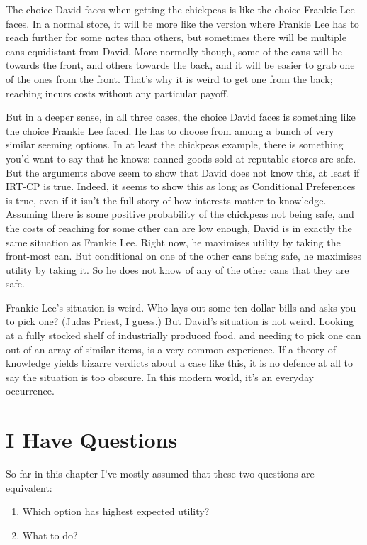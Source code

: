 \documentclass[
  12pt,
  letterpaper,
]{scrbook}
\providecommand{\tightlist}{%
  \setlength{\itemsep}{0pt}\setlength{\parskip}{0pt}}\usepackage{longtable,booktabs,array}
\begin{document}
The choice David faces when getting the chickpeas is like the choice
Frankie Lee faces. In a normal store, it will be more like the version
where Frankie Lee has to reach further for some notes than others, but
sometimes there will be multiple cans equidistant from David. More
normally though, some of the cans will be towards the front, and others
towards the back, and it will be easier to grab one of the ones from the
front. That's why it is weird to get one from the back; reaching incurs
costs without any particular payoff.

But in a deeper sense, in all three cases, the choice David faces is
something like the choice Frankie Lee faced. He has to choose from among
a bunch of very similar seeming options. In at least the chickpeas
example, there is something you'd want to say that he knows: canned
goods sold at reputable stores are safe. But the arguments above seem to
show that David does not know this, at least if IRT-CP is true. Indeed,
it seems to show this as long as Conditional Preferences is true, even
if it isn't the full story of how interests matter to knowledge.
Assuming there is some positive probability of the chickpeas not being
safe, and the costs of reaching for some other can are low enough, David
is in exactly the same situation as Frankie Lee. Right now, he maximises
utility by taking the front-most can. But conditional on one of the
other cans being safe, he maximises utility by taking it. So he does not
know of any of the other cans that they are safe.

Frankie Lee's situation is weird. Who lays out some ten dollar bills and
asks you to pick one? (Judas Priest, I guess.) But David's situation is
not weird. Looking at a fully stocked shelf of industrially produced
food, and needing to pick one can out of an array of similar items, is a
very common experience. If a theory of knowledge yields bizarre verdicts
about a case like this, it is no defence at all to say the situation is
too obscure. In this modern world, it's an everyday occurrence.

\section{I Have Questions}\label{sec-supermarketquestions}

So far in this chapter I've mostly assumed that these two questions are
equivalent:

\begin{enumerate}
\def\labelenumi{\arabic{enumi}.}
\tightlist
\item
  Which option has highest expected utility?
\item
  What to do?
\end{enumerate}
\end{document}
